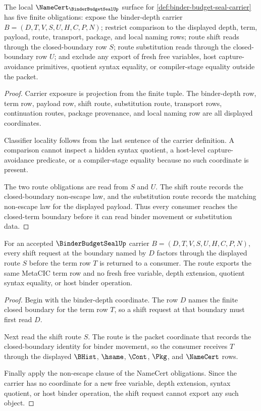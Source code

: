 \begin{theorem}
\label{thm:binder-budget-seal-namecert-obligations}
The local $\NameCert_{\BinderBudgetSealUp}$ surface for \autoref{def:binder-budget-seal-carrier} has five finite obligations: expose the binder-depth carrier $B=(D,T,V,S,U,H,C,P,N)$; restrict comparison to the displayed depth, term, payload, route, transport, package, and local naming rows; route shift reads through the closed-boundary row $S$; route substitution reads through the closed-boundary row $U$; and exclude any export of fresh free variables, host capture-avoidance primitives, quotient syntax equality, or compiler-stage equality outside the packet.
\end{theorem}
\begin{proof}
Carrier exposure is projection from the finite tuple. The binder-depth row, term row, payload row, shift route, substitution route, transport rows, continuation routes, package provenance, and local naming row are all displayed coordinates.

Classifier locality follows from the last sentence of the carrier definition. A comparison cannot inspect a hidden syntax quotient, a host-level capture-avoidance predicate, or a compiler-stage equality because no such coordinate is present.

The two route obligations are read from $S$ and $U$. The shift route records the closed-boundary non-escape law, and the substitution route records the matching non-escape law for the displayed payload. Thus every consumer reaches the closed-term boundary before it can read binder movement or substitution data.
\end{proof}

\begin{theorem}
\label{thm:binder-budget-seal-shift-nonescape}
For an accepted $\BinderBudgetSealUp$ carrier $B=(D,T,V,S,U,H,C,P,N)$, every shift request at the boundary named by $D$ factors through the displayed route $S$ before the term row $T$ is returned to a consumer. The route exports the same MetaCIC term row and no fresh free variable, depth extension, quotient syntax equality, or host binder operation.
\end{theorem}
\begin{proof}
Begin with the binder-depth coordinate. The row $D$ names the finite closed boundary for the term row $T$, so a shift request at that boundary must first read $D$.

Next read the shift route $S$. The route is the packet coordinate that records the closed-boundary identity for binder movement, so the consumer receives $T$ through the displayed $\BHist$, $\hsame$, $\Cont$, $\Pkg$, and $\NameCert$ rows.

Finally apply the non-escape clause of the NameCert obligations. Since the carrier has no coordinate for a new free variable, depth extension, syntax quotient, or host binder operation, the shift request cannot export any such object.
\end{proof}

